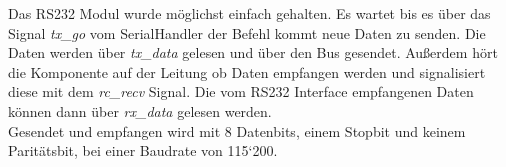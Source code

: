 Das RS232 Modul wurde möglichst einfach gehalten. Es wartet bis es über das Signal 
\textit{tx\_go} vom SerialHandler der Befehl kommt neue Daten zu senden. Die Daten
werden über \textit{tx\_data} gelesen und über den Bus gesendet. Außerdem
hört die Komponente auf der Leitung ob Daten empfangen werden und signalisiert diese 
mit dem \textit{rc\_recv} Signal. Die vom RS232 Interface empfangenen Daten können 
dann über \textit{rx\_data} gelesen werden.\\
Gesendet und empfangen wird mit 8 Datenbits, einem Stopbit und keinem Paritätsbit, bei einer
Baudrate von 115`200.
